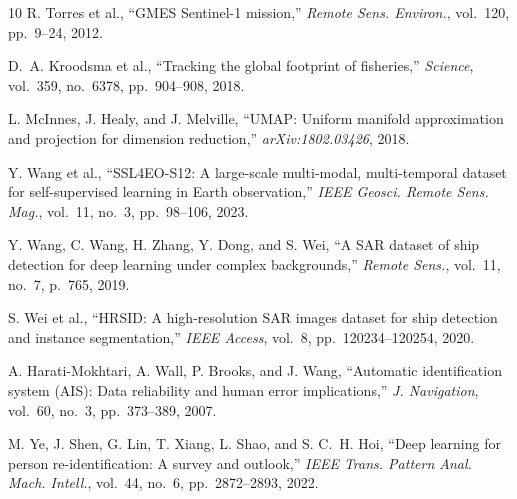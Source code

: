 \documentclass[journal]{IEEEtran}
\begin{document}
\begin{thebibliography}{10}
R. Torres et al., ``{GMES} {Sentinel-1} mission,'' \textit{Remote Sens.
Environ.}, vol.~120, pp.~9--24, 2012.

D.~A. Kroodsma et al., ``Tracking the global footprint of fisheries,''
\textit{Science}, vol.~359, no.~6378, pp.~904--908, 2018.

L. McInnes, J. Healy, and J. Melville, ``{UMAP}: Uniform manifold
approximation and projection for dimension reduction,''
\textit{arXiv:1802.03426}, 2018.

Y. Wang et al., ``{SSL4EO-S12}: A large-scale multi-modal, multi-temporal
dataset for self-supervised learning in Earth observation,'' \textit{IEEE
Geosci. Remote Sens. Mag.}, vol.~11, no.~3, pp.~98--106, 2023.

Y. Wang, C. Wang, H. Zhang, Y. Dong, and S. Wei, ``A {SAR} dataset of ship
detection for deep learning under complex backgrounds,'' \textit{Remote
Sens.}, vol.~11, no.~7, p.~765, 2019.

S. Wei et al., ``{HRSID}: A high-resolution {SAR} images dataset for ship
detection and instance segmentation,'' \textit{IEEE Access}, vol.~8,
pp.~120234--120254, 2020.

A. Harati-Mokhtari, A. Wall, P. Brooks, and J. Wang, ``Automatic
identification system ({AIS}): Data reliability and human error
implications,'' \textit{J. Navigation}, vol.~60, no.~3, pp.~373--389, 2007.

M. Ye, J. Shen, G. Lin, T. Xiang, L. Shao, and S. C.~H. Hoi, ``Deep
learning for person re-identification: A survey and outlook,'' \textit{IEEE
Trans. Pattern Anal. Mach. Intell.}, vol.~44, no.~6, pp.~2872--2893, 2022.

\end{thebibliography}
\end{document}
